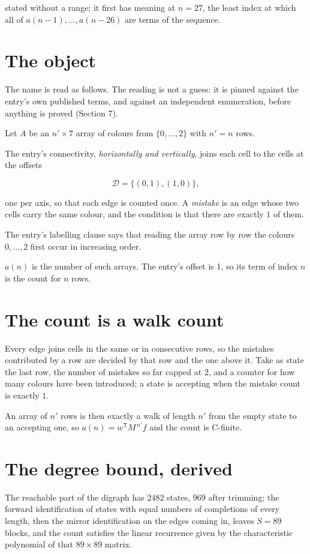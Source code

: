 \documentclass[11pt]{article}
\theoremstyle{definition}
\begin{document}
stated without a range; it first has meaning at $n = 27$, the least index at which all of $a(n-1),\dots,a(n-26)$ are terms of the sequence.

\section{The object}

The name is read as follows. The reading is not a guess: it is pinned against the entry's own published terms, and against an independent enumeration, before anything is proved (Section 7).

Let $A$ be an $n' \times 7$ array of colours from $\{0,\dots,2\}$ with $n' = n$ rows.

The entry's connectivity, {\itshape horizontally and vertically}, joins each cell to the cells at the offsets

\[\mathcal{D} = \{(0,1), (1,0)\},\]

one per axis, so that each edge is counted once. A {\itshape mistake} is an edge whose two cells carry the same colour, and the condition is that there are exactly $1$ of them.

The entry's labelling clause says that reading the array row by row the colours $0,\dots,2$ first occur in increasing order.

$a(n)$ is the number of such arrays. The entry's offset is 1, so its term of index $n$ is the count for $n$ rows.

\section{The count is a walk count}

Every edge joins cells in the same or in consecutive rows, so the mistakes contributed by a row are decided by that row and the one above it. Take as state the last row, the number of mistakes so far capped at $2$, and a counter for how many colours have been introduced; a state is accepting when the mistake count is exactly $1$.

An array of $n'$ rows is then exactly a walk of length $n'$ from the empty state to an accepting one, so $a(n) = w^{\mathsf T}M^{\,n'}f$ and the count is C-finite.

\section{The degree bound, derived}

The reachable part of the digraph has $2482$ states, $969$ after trimming; the forward identification of states with equal numbers of completions of every length, then the mirror identification on the edges coming in, leaves $S = 89$ blocks, and the count satisfies the linear recurrence given by the characteristic polynomial of that $89\times89$ matrix.
\end{document}

